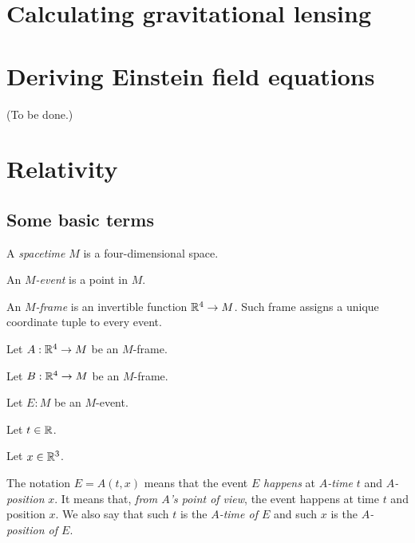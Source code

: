 \section{Calculating gravitational lensing}



\section{Deriving Einstein field equations}

(To be done.)

\section{Relativity}

\subsection{Some basic terms}


A \emph{spacetime} \(M\) is a four-dimensional space.

An \emph{\(M\)-event} is a point in \(M\).

An \emph{\(M\)-frame} is an invertible function \(\mathbb{R}^4 \to M\).
Such frame assigns a unique coordinate tuple to every event.

Let \(A : \mathbb{R}^4 \to M\) be an \(M\)-frame.

Let \(B : \mathbb{R}^4 \to M\) be an \(M\)-frame.

Let \(E : M\) be an \(M\)-event.

Let \(t \in \mathbb{R}\).

Let \(x \in \mathbb{R}^3\).

The notation \(E = A(t,x)\) means that
the event \(E\) \emph{happens} at \emph{\(A\)-time} \(t\) and \emph{\(A\)-position} \(x\).
It means that, \emph{from \(A\)'s point of view},
the event happens at time \(t\) and position \(x\).
We also say that such \(t\) is the \emph{\(A\)-time of \(E\)}
and such \(x\) is the \emph{\(A\)-position of \(E\)}.

